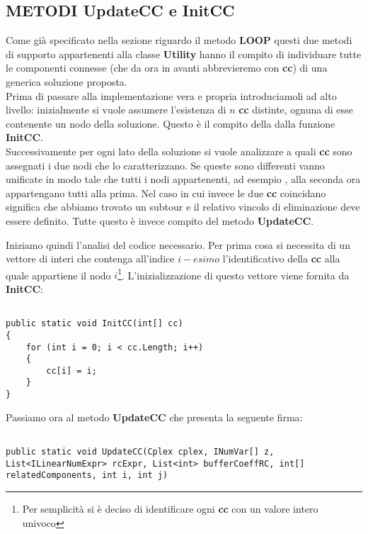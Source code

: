 \documentclass[11pt]{article}
\begin{document}
\subsection*{METODI UpdateCC e InitCC}

Come già specificato nella sezione riguardo il metodo \textbf{LOOP} questi due metodi di supporto appartenenti alla classe \textbf{Utility} hanno il compito di individuare tutte le componenti connesse (che da ora in avanti abbrevieremo con \textbf{cc}) di una generica soluzione proposta.\\
Prima di passare alla implementazione vera e propria introduciamoli ad alto livello: inizialmente si vuole assumere l'esistenza di $n$ \textbf{cc} distinte, ognuna di esse contenente un nodo della soluzione. Questo è il compito della dalla funzione \textbf{InitCC}.\\
Successivamente per ogni lato della soluzione si vuole analizzare a quali \textbf{cc} sono assegnati i due nodi che lo caratterizzano. Se queste sono differenti vanno unificate in modo tale che tutti i nodi appartenenti, ad esempio
, alla seconda ora appartengano tutti alla prima. Nel caso in cui invece le due \textbf{cc} coincidano significa che abbiamo trovato un subtour e il relativo vincolo di eliminazione deve essere definito. Tutte questo è invece compito del metodo \textbf{UpdateCC}.

Iniziamo quindi l'analisi del codice necessario. Per prima cosa si necessita di un vettore di interi che contenga all'indice $i-esimo$ l'identificativo della \textbf{cc} alla quale appartiene il nodo $i$\footnote{Per semplicità si è deciso di identificare ogni \textbf{cc} con un valore intero univoco}. L'inizializzazione di questo vettore viene fornita da \textbf{InitCC}:

\begin{lstlisting}

public static void InitCC(int[] cc)
{
    for (int i = 0; i < cc.Length; i++)
    {
        cc[i] = i;
    }
}

\end{lstlisting}

Passiamo ora al metodo \textbf{UpdateCC} che presenta la seguente firma:

\begin{lstlisting}

public static void UpdateCC(Cplex cplex, INumVar[] z, List<ILinearNumExpr> rcExpr, List<int> bufferCoeffRC, int[] relatedComponents, int i, int j)

\end{lstlisting}
\end{document}
